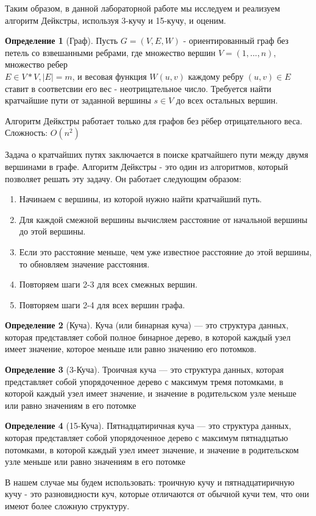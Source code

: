 \documentclass[a4paper, 12pt]{article}
\theoremstyle{definition}
\newtheorem{definition}{Определение}
\begin{document}
	Таким образом, в данной лабораторной работе мы исследуем и реализуем
	алгоритм Дейкстры, используя 3-кучу и 15-кучу, и оценим.
	
	\begin{definition}[Граф]
		Пусть $G=(V,E,W)$ - ориентированный граф без петель со взвешанными ребрами, где множество вершин $V = {(1,...,n)}$, множество ребер\\
		$E\in V*V,|E|=m$, и весовая  функция $W (u,v)$ каждому ребру $(u,v)\in E$ ставит в соответсвии его вес - неотрицательное число. Требуется найти кратчайшие пути от заданной вершины $s\in V$ до всех остальных вершин.
	\end{definition}
	Алгоритм Дейкстры работает только для графов без рёбер отрицательного веса.
	Сложность: $O(n^2)$ \newline
	
	Задача о кратчайших путях заключается в поиске кратчайшего пути между двумя вершинами в графе. Алгоритм Дейкстры - это один из алгоритмов, который позволяет решать эту задачу. Он работает следующим образом:
	
	\begin{enumerate}
		\item Начинаем с вершины, из которой нужно найти кратчайший путь.
		\item Для каждой смежной вершины вычисляем расстояние от начальной вершины до этой вершины.
		\item Если это расстояние меньше, чем уже известное расстояние до этой вершины, то обновляем значение расстояния.
		\item Повторяем шаги 2-3 для всех смежных вершин.
		\item Повторяем шаги 2-4 для всех вершин графа.
	\end{enumerate}
	\begin{definition}[Куча]
		Куча (или бинарная куча) --- это структура данных, которая представляет собой полное бинарное дерево, в которой каждый узел имеет значение, которое меньше или равно значению его потомков.
	\end{definition}
	\begin{definition}[3-Куча]
		Троичная куча --- это структура данных, которая представляет собой упорядоченное дерево с максимум тремя потомками, в которой каждый узел имеет значение, и значение в родительском узле меньше или равно значениям в его потомке
	\end{definition}
	\begin{definition}[15-Куча]
		Пятнадцатиричная куча --- это структура данных, которая представляет собой упорядоченное дерево с максимум пятнадцатью потомками, в которой каждый узел имеет значение, и значение в родительском узле меньше или равно значениям в его потомке
	\end{definition}
	В нашем случае мы будем использовать: троичную кучу и пятнадцатиричную кучу - это разновидности куч, которые отличаются от обычной кучи тем, что они имеют более сложную структуру. \newline
	
\end{document}
